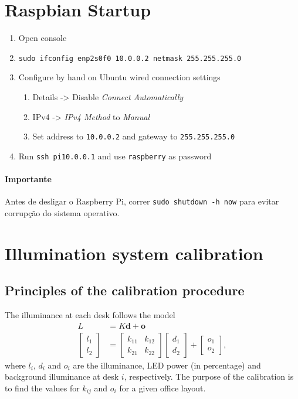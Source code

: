 \documentclass{article}
\begin{document}
\section{Raspbian Startup}
\begin{enumerate}
	\item Open console
	\item \texttt{sudo ifconfig enp2s0f0 10.0.0.2 netmask 255.255.255.0}
	\item Configure by hand on Ubuntu wired connection settings
	\begin{enumerate}
		\item Details -> Disable \textit{Connect Automatically}
		\item IPv4 -> \textit{IPv4 Method} to \textit{Manual}
		\item Set address to \texttt{10.0.0.2} and gateway to \texttt{255.255.255.0}
	\end{enumerate}
	\item Run \texttt{ssh pi\@10.0.0.1} and use \texttt{raspberry} as password
\end{enumerate}

\paragraph{Importante} Antes de desligar o Raspberry Pi, correr \texttt{sudo shutdown -h now} para evitar corrupção do sistema operativo.


\section{Illumination system calibration}

\subsection{Principles of the calibration procedure}

The illuminance at each desk follows the model
\begin{align}
  L &= K \mathbf{d} + \mathbf{o} \nonumber \\ 
  \left[\begin{array}{c} l_{1}\\ l_{2} \end{array}\right] &=
  \left[\begin{array}{cc}
	k_{11} & k_{12}\\
	k_{21} & k_{22}
  \end{array}\right]
  \left[\begin{array}{c} d_{1}\\ d_{2}\end{array}\right]+
  \left[\begin{array}{c} o_{1}\\ o_{2} \end{array}\right],
  \label{eq:model}
\end{align}
where $l_i$, $d_i$ and $o_i$ are the illuminance, LED power (in percentage) and background illuminance at desk $i$, respectively. The purpose of the calibration is to find the values for $k_{ij}$ and $o_i$ for a given office layout.
\end{document}
